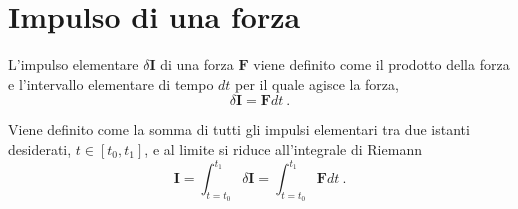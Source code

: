 \section{Impulso di una forza}
\begin{definition}
    L'impulso elementare $\delta \mathbf{I}$ di una forza $\mathbf{F}$ viene definito come il prodotto della forza e l'intervallo elementare di tempo $dt$ per il quale agisce la forza,
    \begin{equation}
        \delta \mathbf{I} = \mathbf{F} dt \ .
    \end{equation}
\end{definition}
\begin{definition} Viene definito come la somma di tutti gli impulsi elementari tra due istanti desiderati,  $t \in [t_0, t_1]$, e al limite si riduce all'integrale di Riemann
    \begin{equation}
        \mathbf{I} = \int_{t=t_0}^{t_1} \delta \mathbf{I} = \int_{t=t_0}^{t_1} \mathbf{F} dt \ .
    \end{equation}
\end{definition}


